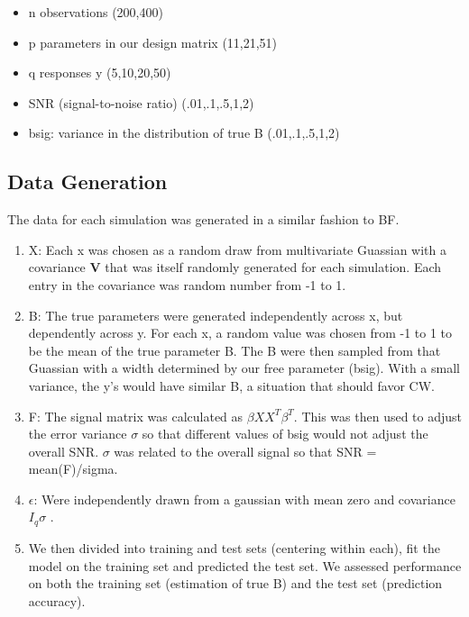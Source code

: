 \documentclass{article}
\begin{document}
\begin{itemize}
\itemsep1pt\parskip0pt
\item
  n observations (200,400)
\item
  p parameters in our design matrix (11,21,51)
\item
  q responses y (5,10,20,50)
\item
  SNR (signal-to-noise ratio) (.01,.1,.5,1,2)
\item
  bsig: variance in the distribution of true B (.01,.1,.5,1,2)
\end{itemize}

\subsection{Data Generation}\label{data-generation}

The data for each simulation was generated in a similar fashion to BF.

\begin{enumerate}
\def\labelenumi{\arabic{enumi}.}
\item
  X: Each x was chosen as a random draw from multivariate Guassian with
  a covariance $ \textbf{V} $ that was itself randomly generated for
  each simulation. Each entry in the covariance was random number from
  -1 to 1.
\item
  B: The true parameters were generated independently across x, but
  dependently across y. For each x, a random value was chosen from -1 to
  1 to be the mean of the true parameter B. The B were then sampled from
  that Guassian with a width determined by our free parameter (bsig).
  With a small variance, the y's would have similar B, a situation that
  should favor CW.
\item
  F: The signal matrix was calculated as $ \beta XX^{T} \beta^{T} $.
  This was then used to adjust the error variance \(\sigma\) so that
  different values of bsig would not adjust the overall SNR. $
  \sigma $ was related to the overall signal so that SNR =
  mean(F)/sigma.
\item
  $ \epsilon $: Were independently drawn from a gaussian with mean
  zero and covariance $ I_q \sigma $ .
\item
  We then divided into training and test sets (centering within each),
  fit the model on the training set and predicted the test set. We
  assessed performance on both the training set (estimation of true B)
  and the test set (prediction accuracy).
\end{enumerate}
\end{document}
